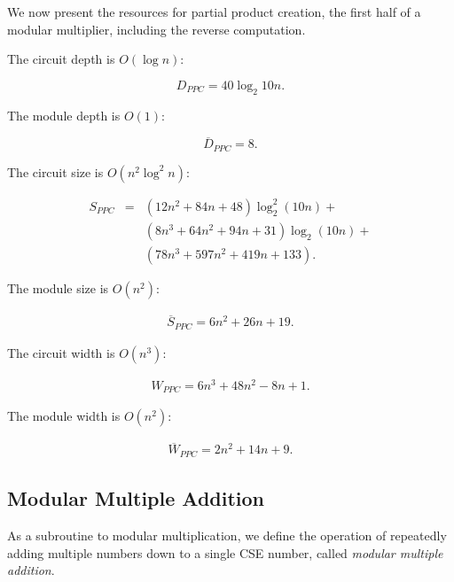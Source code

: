 \documentclass[twoside]{article}
\begin{document}

We now present the resources for partial product creation, the first half of
a modular multiplier, including the reverse computation.

The circuit depth is $O(\log n)$:

\begin{equation}
D_{PPC} = 40\log_2 10 n\text{.}
\end{equation}

The module depth is $O(1)$:

\begin{equation}
\overline{D}_{PPC} = 8\text{.}
\end{equation}

The circuit size is $O(n^2\log^2 n)$:

\begin{eqnarray}
S_{PPC} & = & (12n^2 + 84n + 48)\log^2_2 (10n) +\\
        &   & (8n^3 + 64n^2 + 94n + 31)\log_2(10n) +\\
        &   & (78n^3 + 597n^2 + 419n + 133)\text{.}
\end{eqnarray}

The module size is $O(n^2)$:

\begin{eqnarray}
\overline{S}_{PPC} = 6n^2 + 26n + 19\text{.}
\end{eqnarray}

The circuit width is $O(n^3)$:

\begin{eqnarray}
W_{PPC} = 6n^3 + 48n^2 - 8n + 1\text{.}
\end{eqnarray}

The module width is $O(n^2)$:

\begin{eqnarray}
\overline{W}_{PPC} = 2n^2 + 14n + 9\text{.}
\end{eqnarray}

\subsection{Modular Multiple Addition}
\label{subsec:mma}

As a subroutine to modular multiplication, we define the operation of
repeatedly adding multiple numbers down to a single CSE number, called
\emph{modular multiple addition}.
\end{document}
